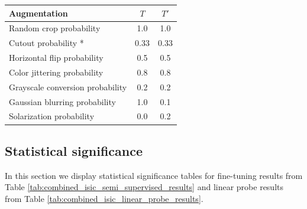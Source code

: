 \documentclass[a4paper,fleqn]{cas-dc}
\begin{document}
\begin{center}
\begin{tabular}{lcc}
\hline
Augmentation & $T$ & $T'$ \\
\hline
Random crop probability & 1.0 & 1.0 \\
Cutout probability * & 0.33 & 0.33 \\
Horizontal flip probability & 0.5 & 0.5 \\
Color jittering probability & 0.8 & 0.8 \\
Grayscale conversion probability & 0.2 & 0.2 \\
Gaussian blurring probability & 1.0 & 0.1 \\
Solarization probability & 0.0 & 0.2 \\
\hline
\end{tabular}
\end{center}
\label{tab:bt_aug_prob}



\clearpage
\subsection{Statistical significance}
In this section we display statistical significance tables for fine-tuning results from Table \ref{tab:combined_isic_semi_supervised_results} and linear probe results from Table \ref{tab:combined_isic_linear_probe_results}.

\end{document}

